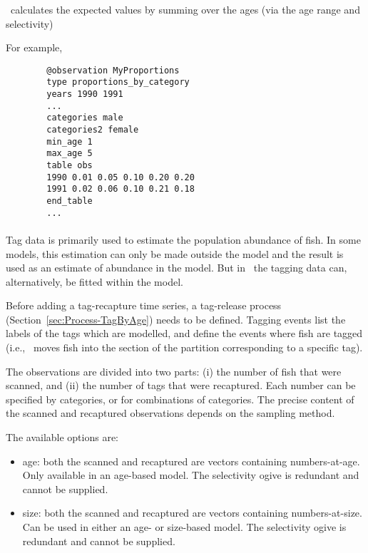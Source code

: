 \CNAME\ calculates the expected values by summing over the ages (via the age range and selectivity)

For example,

{\small{\begin{verbatim}
		@observation MyProportions
		type proportions_by_category
		years 1990 1991
		...
		categories male
		categories2 female
		min_age 1
		max_age 5
		table obs
		1990 0.01 0.05 0.10 0.20 0.20
		1991 0.02 0.06 0.10 0.21 0.18
		end_table
		...
		\end{verbatim}}}

\paragraph*{\label{sec:Observation-TagRecaptureByLength}}

Tag data is primarily used to estimate the population abundance of fish. In some models, this estimation can only be made outside the model and the result is used as an estimate of abundance in the model. But in \CNAME\ the tagging data can, alternatively, be fitted within the model.

Before adding a tag-recapture time series, a tag-release process (Section~\ref{sec:Process-TagByAge}) needs to be defined. Tagging events list the labels of the tags which are modelled, and define the events where fish are tagged (i.e., \CNAME\ moves fish into the section of the partition corresponding to a specific tag).

The observations are divided into two parts: (i) the number of fish that were scanned, and (ii) the number of tags that were recaptured. Each number can be specified by categories, or for combinations of categories. The precise content of the scanned and recaptured observations depends on the sampling method.

The available options are:

\begin{itemize}
	\item age: both the scanned and recaptured are vectors containing numbers-at-age. Only available in an age-based model. The selectivity ogive is redundant and cannot be supplied.
	\item size: both the scanned and recaptured are vectors containing numbers-at-size. Can be used in either an age- or size-based model. The selectivity ogive is redundant and cannot be supplied.
\end{itemize}

